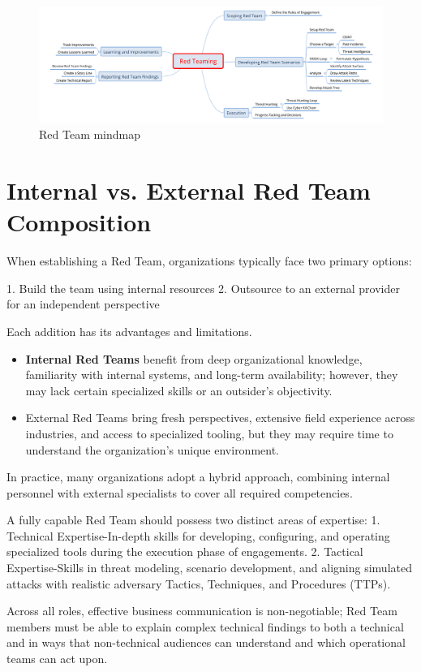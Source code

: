 \begin{figure}
    \centering
    \includegraphics[width=0.75\linewidth]{rtmindmap.png}
    \caption{Red Team mindmap}
    \label{fig:placeholder}
\end{figure}

\section{Internal vs. External Red Team Composition}
When establishing a Red Team, organizations typically face two primary options:

1. Build the team using internal resources
2. Outsource to an external provider for an independent perspective

Each addition has its advantages and limitations.
\begin{itemize}
    \item \textbf{Internal Red Teams} benefit from deep organizational knowledge, familiarity with internal systems, and long-term availability; however, they may lack certain specialized skills or an outsider's objectivity.
    \item External Red Teams bring fresh perspectives, extensive field experience across industries, and access to specialized tooling, but they may require time to understand the organization's unique environment.
\end{itemize}

In practice, many organizations adopt a hybrid approach, combining internal personnel with external specialists to cover all required competencies.

A fully capable Red Team should possess two distinct areas of expertise:
1. Technical Expertise-In-depth skills for developing, configuring, and operating specialized tools during the execution phase of engagements.
2. Tactical Expertise-Skills in threat modeling, scenario development, and aligning simulated attacks with realistic adversary Tactics, Techniques, and Procedures (TTPs).

Across all roles, effective business communication is non-negotiable; Red Team members must be able to explain complex technical findings to both a technical and in ways that non-technical audiences can understand and which operational teams can act upon.

